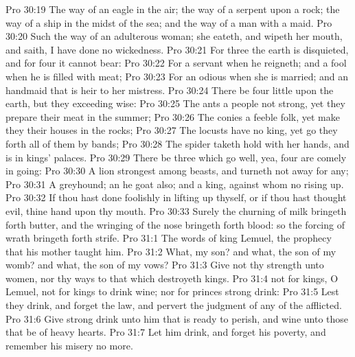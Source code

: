 \vs Pro 30:19 The way of an eagle in the air; the way of a serpent upon a rock; the way of a ship in the midst of the sea; and the way of a man with a maid.
\vs Pro 30:20 Such  the way of an adulterous woman; she eateth, and wipeth her mouth, and saith, I have done no wickedness.
\vs Pro 30:21 For three  the earth is disquieted, and for four  it cannot bear:
\vs Pro 30:22 For a servant when he reigneth; and a fool when he is filled with meat;
\vs Pro 30:23 For an odious  when she is married; and an handmaid that is heir to her mistress.
\vs Pro 30:24 There be four  little upon the earth, but they  exceeding wise:
\vs Pro 30:25 The ants  a people not strong, yet they prepare their meat in the summer;
\vs Pro 30:26 The conies  a feeble folk, yet make they their houses in the rocks;
\vs Pro 30:27 The locusts have no king, yet go they forth all of them by bands;
\vs Pro 30:28 The spider taketh hold with her hands, and is in kings' palaces.
\vs Pro 30:29 There be three  which go well, yea, four are comely in going:
\vs Pro 30:30 A lion  strongest among beasts, and turneth not away for any;
\vs Pro 30:31 A greyhound; an he goat also; and a king, against whom  no rising up.
\vs Pro 30:32 If thou hast done foolishly in lifting up thyself, or if thou hast thought evil,  thine hand upon thy mouth.
\vs Pro 30:33 Surely the churning of milk bringeth forth butter, and the wringing of the nose bringeth forth blood: so the forcing of wrath bringeth forth strife.
\vs Pro 31:1 The words of king Lemuel, the prophecy that his mother taught him.
\vs Pro 31:2 What, my son? and what, the son of my womb? and what, the son of my vows?
\vs Pro 31:3 Give not thy strength unto women, nor thy ways to that which destroyeth kings.
\vs Pro 31:4  not for kings, O Lemuel,  not for kings to drink wine; nor for princes strong drink:
\vs Pro 31:5 Lest they drink, and forget the law, and pervert the judgment of any of the afflicted.
\vs Pro 31:6 Give strong drink unto him that is ready to perish, and wine unto those that be of heavy hearts.
\vs Pro 31:7 Let him drink, and forget his poverty, and remember his misery no more.
